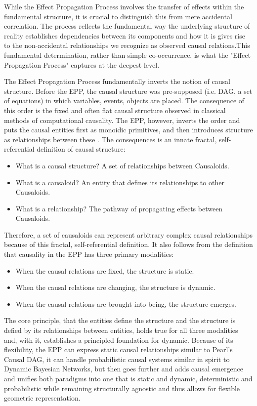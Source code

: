 While the Effect Propagation Process involves the transfer of effects within the fundamental structure, it is crucial to distinguish this from mere accidental correlation. The process reflects the fundamental way the underlying structure of reality establishes dependencies between its components and how it is gives rise to the non-accidental relationships we recognize as observed causal relations.This fundamental determination, rather than simple co-occurrence, is what the "Effect Propagation Process" captures at the deepest level.

 The Effect Propagation Process fundamentally inverts the notion of causal structure. Before the EPP, the causal structure was pre-supposed (i.e. DAG, a set of equations) in which variables, events, objects are placed. The consequence of this order is the fixed and often flat causal structure observed in classical methods of computational causality. The EPP, however, inverts the order and puts the causal entities first as monoidic primitives, and then introduces structure as relationships between these . The consequences is an innate fractal, self-referential definition of causal structure:

\begin{itemize}
	\item What is a causal structure? A set of relationships between Causaloids.
 	\item What is a causaloid? An entity that defines its relationships to other Causaloids. 
	\item What is a relationship? The pathway of propagating effects between Causaloids.
\end{itemize}

Therefore, a set of causaloids can represent arbitrary complex causal relationships because of this fractal, self-referential definition. It also follows from the definition that causality in the EPP has three primary modalities:
\begin{itemize}
	\item When the causal relations are fixed, the structure is static.
 	\item When the causal relations are changing, the structure is dynamic. 
 	\item When the causal relations are brought into being, the structure emerges. 
\end{itemize}

The core principle, that the entities define the structure and the structure is defied by its relationships between entities, holds true for all three modalities and, with it, establishes a principled foundation for dynamic. Because of its flexibility, the EPP can express static causal relationships similar to Pearl’s Causal DAG, it can handle probabilistic causal systems similar in spirit to Dynamic Bayesian Networks, but then goes further and  adds causal emergence and unifies both paradigms into one that is static and dynamic, deterministic and probabilistic while remaining structurally agnostic and thus allows for flexible geometric representation.

